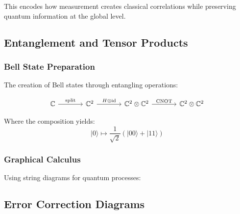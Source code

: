 This encodes how measurement creates classical correlations while preserving quantum information at the global level.

\subsection{Entanglement and Tensor Products}

\subsubsection{Bell State Preparation}

The creation of Bell states through entangling operations:

\[
\begin{tikzcd}[column sep=large]
\mathbb{C} \arrow[r, "\text{split}"] & 
\mathbb{C}^2 \arrow[r, "H \otimes \text{id}"] & 
\mathbb{C}^2 \otimes \mathbb{C}^2 \arrow[r, "\text{CNOT}"] & 
\mathbb{C}^2 \otimes \mathbb{C}^2
\end{tikzcd}
\]

Where the composition yields:
\[
|0\rangle \mapsto \frac{1}{\sqrt{2}}(|00\rangle + |11\rangle)
\]

\subsubsection{Graphical Calculus}

Using string diagrams for quantum processes:

\begin{center}
\end{center}

\subsection{Error Correction Diagrams}

